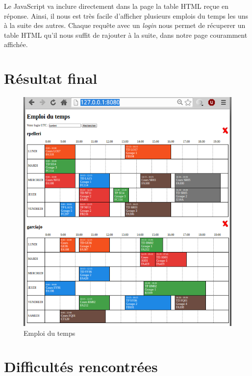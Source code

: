 \medskip

Le JavaScript va inclure directement dans la page la table HTML reçue en réponse. Ainsi, il nous est très facile d'afficher plusieurs emplois du temps les uns à la suite des autres. Chaque requête avec un \textit{login} nous permet de récuperer un table HTML qu'il nous suffit de rajouter à la suite, dans notre page couramment affichée.

\section{Résultat final}

\begin{figure}[H]
    \centering\includegraphics[width=1.00\textwidth]{images/edt.png}
    \caption{Emploi du temps}
\end{figure}


\section{Difficultés rencontrées}
